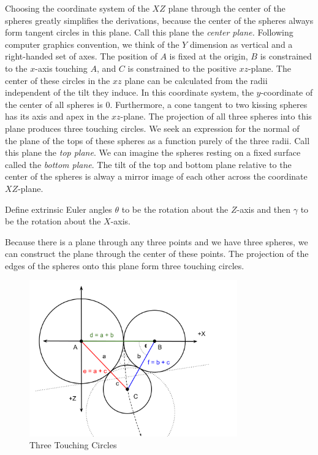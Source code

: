 \documentclass{article}
\begin{document}
Choosing the coordinate system of the $XZ$ plane through the center of the spheres greatly
simplifies the derivations, because the center of the spheres always form tangent circles
in this plane. Call this plane the {\em center plane.}
Following computer graphics convention, we think of the $Y$ dimension as vertical and a
right-handed set of axes.
The position of $A$ is fixed at the origin, $B$ is constrained to the $x$-axis touching $A$, and
$C$ is constrained to the positive $xz$-plane. The center of these circles in the $xz$ plane can be
calculated from the radii independent of the tilt they induce.
In this coordinate system, the $y$-coordinate of the center of all spheres is $0$.
Furthermore, a cone tangent to two kissing spheres has its axis and apex in the $xz$-plane.
The projection of all three spheres into this plane produces three touching circles.
We seek an expression for the normal of the plane of the tops of these spheres as a function
purely of the three radii. Call this plane the {\em top plane}.
We can imagine the spheres resting on a fixed surface called the {\em bottom plane}.
The tilt of the top and bottom plane relative to the center of the spheres
is alway a mirror image of each other across the coordinate $XZ$-plane.


Define extrinsic Euler angles $\theta$ to be the rotation about the $Z$-axis and then $\gamma$ to
be the rotation about the $X$-axis.

Because there is a plane through any three points and we have three spheres, we can construct the plane through
the center of these points.
The projection of the edges of the spheres onto this plane form three touching circles.

\begin{figure}
     \centering
     \includegraphics[width=0.8\textwidth]{figures/ThreeTouchingPlanarCircles.png}
     \caption{Three Touching Circles}
  \label{fig:Tangent}
\end{figure}
\end{document}
